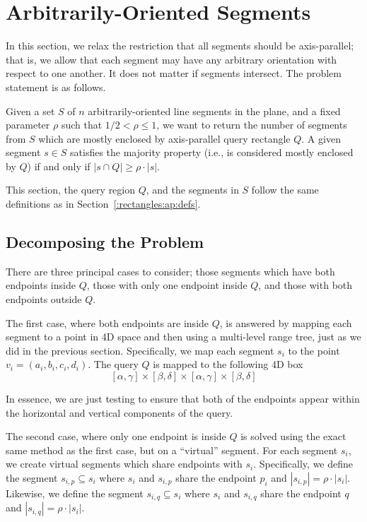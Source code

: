 \section{Arbitrarily-Oriented Segments}
\label{:rectangles:ao}

In this section, we relax the restriction that all segments should be axis-parallel; that is, we allow that each segment may have any arbitrary orientation with respect to one another.  It does not matter if segments intersect. The problem statement is as follows.

\begin{problem}
Given a set $S$ of $n$ arbitrarily-oriented line segments in the plane, and a fixed parameter $\rho$ such that $1/2 < \rho \leq 1$, we want to return the number of segments from $S$ which are mostly enclosed by axis-parallel query rectangle $Q$. A given segment $s \in S$ satisfies the majority property (i.e., is considered mostly enclosed by $Q$) if and only if $|s \cap Q| \geq \rho \cdot |s|$.
\end{problem}

This section, the query region $Q$, and the segments in $S$ follow the same definitions as in Section~\ref{:rectangles:ap:defs}.

\subsection{Decomposing the Problem}
\label{:rectangles:ao:approach}

There are three principal cases to consider; those segments which have both endpoints inside $Q$, those with only one endpoint inside $Q$, and those with both endpoints outside $Q$.  

The first case, where both endpoints are inside $Q$, is answered by mapping each segment to a point in 4D space and then using a multi-level range tree, just as we did in the previous section.  Specifically, we map each segment $s_i$ to the point $v_i = (a_i, b_i, c_i, d_i)$. The query $Q$ is mapped to the following 4D box
\[
[\alpha, \gamma] \times [\beta, \delta] \times [\alpha, \gamma] \times [\beta, \delta]
\]

In essence, we are just testing to ensure that both of the endpoints appear within the horizontal and vertical components of the query.

The second case, where only one endpoint is inside $Q$ is solved using the exact same method as the first case, but on a ``virtual'' segment.  For each segment $s_i$, we create virtual segments which share endpoints with $s_i$.  Specifically, we define the segment $s_{i,p} \subseteq s_i$ where $s_i$ and $s_{i,p}$ share the endpoint $p_i$ and $|s_{i,p}| = \rho \cdot |s_i|$. Likewise, we define the segment $s_{i,q} \subseteq s_i$ where $s_i$ and $s_{i,q}$ share the endpoint $q$ and $|s_{i,q}| = \rho \cdot |s_i|$.

